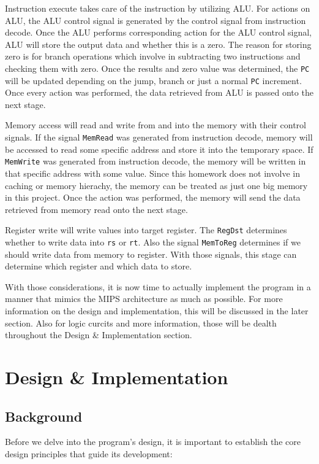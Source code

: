 \documentclass{homework}
\begin{document}
Instruction execute takes care of the instruction by utilizing ALU. For actions on ALU, the ALU control signal is generated by the control signal from instruction decode. Once the ALU performs corresponding action for the ALU control signal, ALU will store the output data and whether this is a zero. The reason for storing zero is for branch operations which involve in subtracting two instructions and checking them with zero. Once the results and zero value was determined, the \texttt{PC} will be updated depending on the jump, branch or just a normal \texttt{PC} increment. Once every action was performed, the data retrieved from ALU is passed onto the next stage.

Memory access will read and write from and into the memory with their control signals. If the signal \texttt{MemRead} was generated from instruction decode, memory will be accessed to read some specific address and store it into the temporary space. If \texttt{MemWrite} was generated from instruction decode, the memory will be written in that specific address with some value. Since this homework does not involve in caching or memory hierachy, the memory can be treated as just one big memory in this project. Once the action was performed, the memory will send the data retrieved from memory read onto the next stage.

Register write will write values into target register. The \texttt{RegDst} determines whether to write data into \texttt{rs} or \texttt{rt}. Also the signal \texttt{MemToReg} determines if we should write data from memory to register. With those signals, this stage can determine which register and which data to store. 

With those considerations, it is now time to actually implement the program in a manner that mimics the MIPS architecture as much as possible. For more information on the design and implementation, this will be discussed in the later section. Also for logic curcits and more information, those will be dealth throughout the Design \& Implementation section. 

\pagebreak
\section{Design \& Implementation}
\subsection{Background}
Before we delve into the program's design, it is important to establish the core design principles that guide its development:
\end{document}
